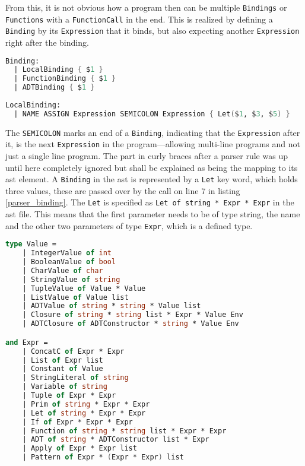 From this, it is not obvious how a program then can be multiple \texttt{Bindings} or \texttt{Functions} with a \texttt{FunctionCall} in the end. This is realized by defining a \texttt{Binding} by its \texttt{Expression} that it binds, but also expecting another \texttt{Expression} right after the binding.

\begin{lstlisting}[columns=fullflexible, label={parser_binding}, language=FSharp, caption=Binding with \texttt{Expression} afterwards]
Binding:
  | LocalBinding { $1 }
  | FunctionBinding { $1 }
  | ADTBinding { $1 }
  
LocalBinding:
  | NAME ASSIGN Expression SEMICOLON Expression { Let($1, $3, $5) }
\end{lstlisting}

The \texttt{SEMICOLON} marks an end of a \texttt{Binding}, indicating that the \texttt{Expression} after it, is the next \texttt{Expression} in the program---allowing multi-line programs and not just a single line program. The part in curly braces after a parser rule was up until here completely ignored but shall be explained as being the mapping to its \gls{ast} element. A \texttt{Binding} in the \gls{ast} is represented by a \texttt{Let} key word, which holds three values, these are passed over by the call on line 7 in listing \ref{parser_binding}.
The \texttt{Let} is specified as \texttt{Let of string * Expr * Expr} in the \gls{ast} file. This means that the first parameter needs to be of type string, the name and the other two parameters of type \texttt{Expr}, which is a defined type.

\begin{lstlisting}[columns=fullflexible, label={ast}, language=FSharp, caption=An excerpt of the \gls{ast} of JaLi]
type Value =    
    | IntegerValue of int
    | BooleanValue of bool
    | CharValue of char
    | StringValue of string
    | TupleValue of Value * Value
    | ListValue of Value list
    | ADTValue of string * string * Value list
    | Closure of string * string list * Expr * Value Env
    | ADTClosure of ADTConstructor * string * Value Env

and Expr =
    | ConcatC of Expr * Expr
    | List of Expr list
    | Constant of Value
    | StringLiteral of string
    | Variable of string
    | Tuple of Expr * Expr
    | Prim of string * Expr * Expr
    | Let of string * Expr * Expr
    | If of Expr * Expr * Expr
    | Function of string * string list * Expr * Expr
    | ADT of string * ADTConstructor list * Expr
    | Apply of Expr * Expr list
    | Pattern of Expr * (Expr * Expr) list
\end{lstlisting}

